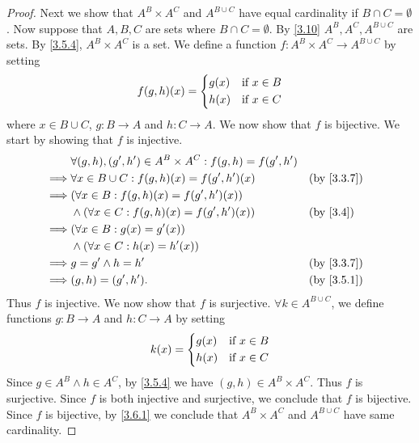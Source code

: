 \begin{proof}
  Next we show that \(A^B \times A^C\) and \(A^{B \cup C}\) have equal cardinality if \(B \cap C = \emptyset\).
  Now suppose that \(A, B, C\) are sets where \(B \cap C = \emptyset\).
  By \cref{3.10} \(A^B, A^C, A^{B \cup C}\) are sets.
  By \cref{3.5.4}, \(A^B \times A^C\) is a set.
  We define a function \(f : A^B \times A^C \to A^{B \cup C}\) by setting
  \[
    f(g, h)(x) = \begin{dcases}
      g(x) & \text{if } x \in B \\
      h(x) & \text{if } x \in C
    \end{dcases}
  \]
  where \(x \in B \cup C\), \(g : B \to A\) and \(h : C \to A\).
  We now show that \(f\) is bijective.
  We start by showing that \(f\) is injective.
  \begin{align*}
             & \forall (g, h), (g', h') \in A^B \times A^C : f(g, h) = f(g', h')                             \\
    \implies & \forall x \in B \cup C : f(g, h)(x) = f(g', h')(x)                &  & \by{3.3.7}             \\
    \implies & (\forall x \in B : f(g, h)(x) = f(g', h')(x))                                                 \\
             & \land (\forall x \in C : f(g, h)(x) = f(g', h')(x))               &  & \text{(by \cref{3.4})} \\
    \implies & (\forall x \in B : g(x) = g'(x))                                                              \\
             & \land (\forall x \in C : h(x) = h'(x))                                                        \\
    \implies & g = g' \land h = h'                                               &  & \by{3.3.7}             \\
    \implies & (g, h) = (g', h').                                                &  & \by{3.5.1}
  \end{align*}
  Thus \(f\) is injective.
  We now show that \(f\) is surjective.
  \(\forall k \in A^{B \cup C}\), we define functions \(g : B \to A\) and \(h : C \to A\) by setting
  \[
    k(x) = \begin{dcases}
      g(x) & \text{if } x \in B \\
      h(x) & \text{if } x \in C
    \end{dcases}
  \]
  Since \(g \in A^B \land h \in A^C\), by \cref{3.5.4} we have \((g, h) \in A^B \times A^C\).
  Thus \(f\) is surjective.
  Since \(f\) is both injective and surjective, we conclude that \(f\) is bijective.
  Since \(f\) is bijective, by \cref{3.6.1} we conclude that \(A^B \times A^C\) and \(A^{B \cup C}\) have same cardinality.


\end{proof}
